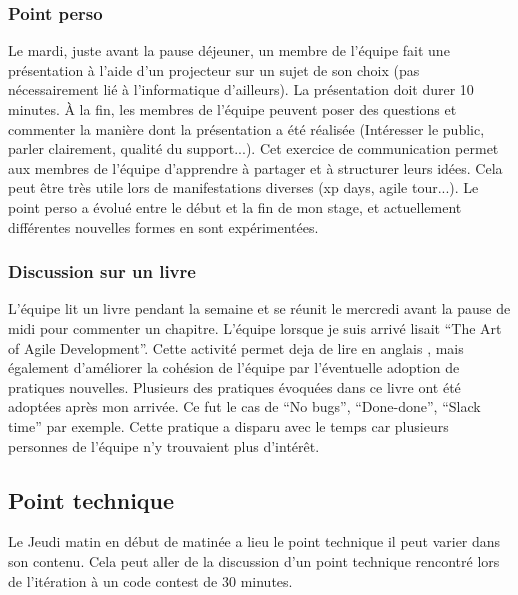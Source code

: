 \subsubsection{Point perso}
Le mardi, juste avant la pause déjeuner, un membre de l'équipe fait une présentation à l'aide d'un projecteur sur un sujet de son choix (pas nécessairement lié à l'informatique d'ailleurs). La présentation doit durer 10 minutes. À la fin, les membres de l'équipe peuvent poser des questions et commenter la manière dont la présentation a été réalisée (Intéresser le public, parler clairement, qualité du support...). Cet exercice de communication permet aux membres de l'équipe d'apprendre à partager et à structurer leurs idées. Cela peut être très utile lors de manifestations diverses (xp days, agile tour...). Le point perso a évolué entre le début et la fin de mon stage, et actuellement différentes nouvelles formes en sont expérimentées.

\subsubsection{Discussion sur un livre}
L'équipe lit un livre pendant la semaine et se réunit le mercredi avant la pause de midi pour commenter un chapitre. L'équipe lorsque je suis arrivé lisait ``The Art of Agile Development''. Cette activité permet deja de lire en anglais , mais également d'améliorer la cohésion de l'équipe par l'éventuelle adoption de pratiques nouvelles. Plusieurs des pratiques évoquées dans ce livre ont été adoptées après mon arrivée. Ce fut le cas de ``No bugs'', ``Done-done'', ``Slack time'' par exemple. Cette pratique a disparu avec le temps car plusieurs personnes de l'équipe n'y trouvaient plus d'intérêt.

\subsection{Point technique}
Le Jeudi matin en début de matinée a lieu le point technique il peut varier dans son contenu. Cela peut aller de la discussion d'un point technique rencontré lors de l'itération à un code contest de 30 minutes.

